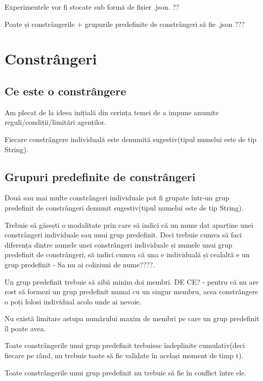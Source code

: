 \documentclass{article}
\begin{document}
Experimentele vor fi stocate sub formă de fișier .json. ??

Poate și constrângerile + grupurile predefinite de constrângeri să fie .json ???

\section{Constrângeri}
\subsection{Ce este o constrângere}
Am plecat de la ideea inițială din cerința temei de a impune anumite reguli/condiții/limitări agenților.

\textbf{\color{red}{O constrângere înseamnă o singură condiție/regulă/limitare impusă care trebuie, obligatoriu, respectată. } }

\textbf{\color{red}{CONSTRÂNGERE = condiție, regulă, limitare care trebuie respectată obligatoriu.} }

Fiecare constrângere individuală este denumită sugestiv(tipul numelui este de tip String).

\subsection{Grupuri predefinite de constrângeri}
Două sau mai multe constrângeri individuale pot fi grupate într-un grup predefinit de constrângeri denumit sugestiv(tipul numelui este de tip String).

Trebuie să găsești o modalitate prin care să indici că un nume dat aparține unei constrângeri individuale sau unui grup predefinit. Deci trebuie cumva să faci diferența dintre numele unei constrângeri individuale și numele unui grup predefinit de constrângeri, să indici cumva că una e individuală și cealaltă e un grup predefinit - Sa nu ai coliziuni de nume????.

Un grup predefinit trebuie să aibă minim doi membri. DE CE? - pentru că nu are rost să formezi un grup predefinit numai cu un singur membru, acea constrângere o poți folosi individual acolo unde ai nevoie.

Nu există limitare astupa numărului maxim de membri pe care un grup predefinit îl poate avea.

Toate constrângerile unui grup predefinit trebuiesc îndeplinite cumulativ(deci fiecare pe rând, nu trebuie toate să fie validate în același moment de timp t).

Toate constrângerile unui grup predefinit nu trebuie să fie în conflict între ele.
\end{document}
